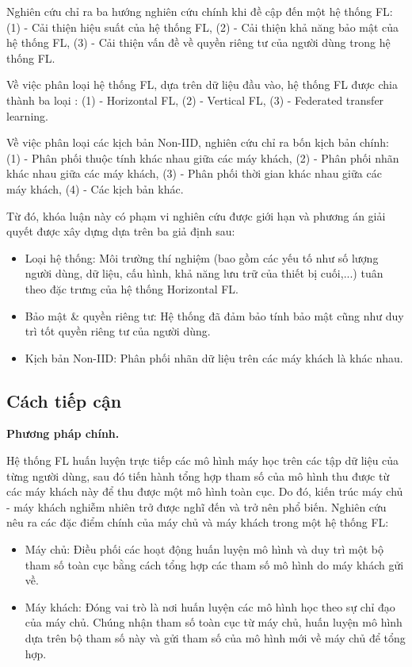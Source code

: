 Nghiên cứu \cite{yin2021comprehensive} chỉ ra ba hướng nghiên cứu chính khi đề cập đến một hệ thống FL: (1) - Cải thiện hiệu suất của hệ thống FL, (2) - Cải thiện khả năng bảo mật của hệ thống FL, (3) - Cải thiện vấn đề về quyền riêng tư của người dùng trong hệ thống FL.

Về việc phân loại hệ thống FL, dựa trên dữ liệu đầu vào, hệ thống FL được chia thành ba loại \cite{yin2021comprehensive}: (1) - Horizontal FL, (2) - Vertical FL, (3) - Federated transfer learning.

Về việc phân loại các kịch bản Non-IID, nghiên cứu \cite{zhu2021federated} chỉ ra bốn kịch bản chính: (1) - Phân phối thuộc tính khác nhau giữa các máy khách, (2) - Phân phối nhãn khác nhau giữa các máy khách, (3) - Phân phối thời gian khác nhau giữa các máy khách, (4) - Các kịch bản khác.

Từ đó, khóa luận này có phạm vi nghiên cứu được giới hạn và phương án giải quyết được xây dựng dựa trên ba giả định sau:

\begin{itemize}
    \item Loại hệ thống: Môi trường thí nghiệm (bao gồm các yếu tố như số lượng người dùng, dữ liệu, cấu hình, khả năng lưu trữ của thiết bị cuối,...) tuân theo đặc trưng của hệ thống Horizontal FL.
    \item Bảo mật \& quyền riêng tư: Hệ thống đã đảm bảo tính bảo mật cũng như duy trì tốt quyền riêng tư của người dùng.
    \item Kịch bản Non-IID: Phân phối nhãn dữ liệu trên các máy khách là khác nhau.
\end{itemize}

\subsection*{Cách tiếp cận}

\textbf{Phương pháp chính.}

Hệ thống FL huấn luyện trực tiếp các mô hình máy học trên các tập dữ liệu của từng người dùng, sau đó tiến hành tổng hợp tham số của mô hình thu được từ các máy khách này để thu được một mô hình toàn cục. Do đó, kiến trúc máy chủ - máy khách nghiễm nhiên trở được nghĩ đến và trở nên phổ biến. Nghiên cứu \cite{yin2021comprehensive} nêu ra các đặc điểm chính của máy chủ và máy khách trong một hệ thống FL:

\begin{itemize}
    \item Máy chủ: Điều phối các hoạt động huấn luyện mô hình và duy trì một bộ tham số toàn cục bằng cách tổng hợp các tham số mô hình do máy khách gửi về.
    \item Máy khách: Đóng vai trò là nơi huấn luyện các mô hình học theo sự chỉ đạo của máy chủ. Chúng nhận tham số toàn cục từ máy chủ, huấn luyện mô hình dựa trên bộ tham số này và gửi tham số của mô hình mới về máy chủ để tổng hợp.
\end{itemize}

